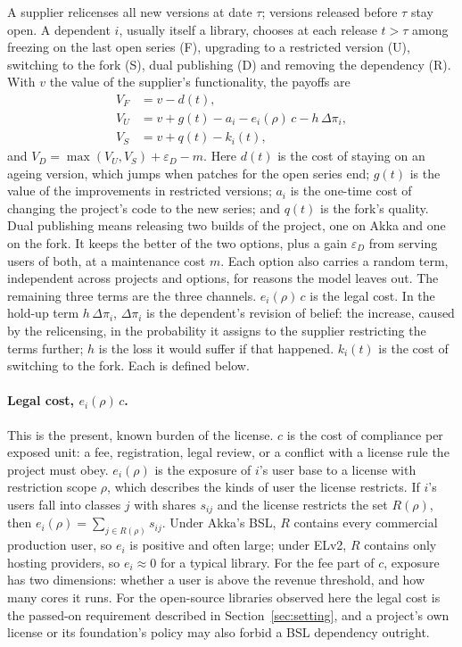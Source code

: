 \documentclass[11pt]{article}
\begin{document}
A supplier relicenses all new versions at date $\tau$; versions released before $\tau$ stay open. A dependent $i$, usually itself a library, chooses at each release $t>\tau$ among freezing on the last open series (F), upgrading to a restricted version (U), switching to the fork (S), dual publishing (D) and removing the dependency (R). With $v$ the value of the supplier's functionality, the payoffs are
\begin{align*}
V_F &= v - d(t), \\
V_U &= v + g(t) - a_i - e_i(\rho)\,c - h\,\Delta\pi_i, \\
V_S &= v + q(t) - k_i(t),
\end{align*}
and $V_D = \max(V_U,V_S) + \varepsilon_D - m$. Here $d(t)$ is the cost of staying on an ageing version, which jumps when patches for the open series end; $g(t)$ is the value of the improvements in restricted versions; $a_i$ is the one-time cost of changing the project's code to the new series; and $q(t)$ is the fork's quality. Dual publishing means releasing two builds of the project, one on Akka and one on the fork. It keeps the better of the two options, plus a gain $\varepsilon_D$ from serving users of both, at a maintenance cost $m$. Each option also carries a random term, independent across projects and options, for reasons the model leaves out. The remaining three terms are the three channels. $e_i(\rho)\,c$ is the legal cost. In the hold-up term $h\,\Delta\pi_i$, $\Delta\pi_i$ is the dependent's revision of belief: the increase, caused by the relicensing, in the probability it assigns to the supplier restricting the terms further; $h$ is the loss it would suffer if that happened. $k_i(t)$ is the cost of switching to the fork. Each is defined below.

\paragraph{Legal cost, $e_i(\rho)\,c$.} This is the present, known burden of the license. $c$ is the cost of compliance per exposed unit: a fee, registration, legal review, or a conflict with a license rule the project must obey. $e_i(\rho)$ is the exposure of $i$'s user base to a license with restriction scope $\rho$, which describes the kinds of user the license restricts. If $i$'s users fall into classes $j$ with shares $s_{ij}$ and the license restricts the set $R(\rho)$, then $e_i(\rho)=\sum_{j\in R(\rho)} s_{ij}$. Under Akka's BSL, $R$ contains every commercial production user, so $e_i$ is positive and often large; under ELv2, $R$ contains only hosting providers, so $e_i\approx 0$ for a typical library. For the fee part of $c$, exposure has two dimensions: whether a user is above the revenue threshold, and how many cores it runs. For the open-source libraries observed here the legal cost is the passed-on requirement described in Section~\ref{sec:setting}, and a project's own license or its foundation's policy may also forbid a BSL dependency outright.
\end{document}

